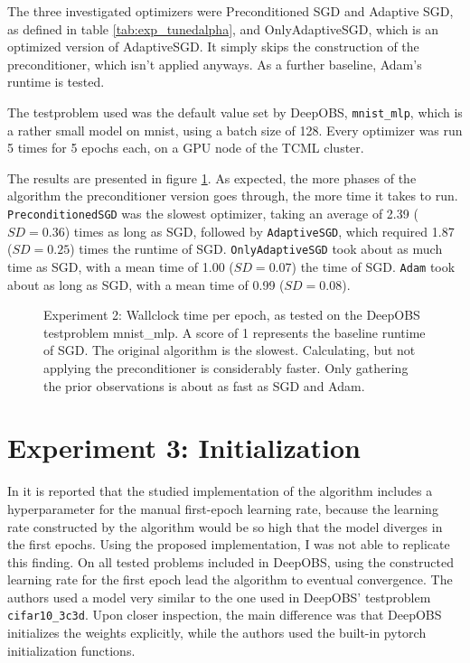\documentclass[twoside,12pt,a4paper]{report}
\begin{document}
The three investigated optimizers were Preconditioned SGD and Adaptive SGD, as defined in table \ref{tab:exp_tunedalpha}, and OnlyAdaptiveSGD, which is an optimized version of AdaptiveSGD. It simply skips the construction of the preconditioner, which isn't applied anyways.
As a further baseline, Adam's runtime is tested.

The testproblem used was the default value set by DeepOBS, \verb|mnist_mlp|, which is a rather small model on mnist, using a batch size of 128. Every optimizer was run 5 times for 5 epochs each, on a GPU node of the TCML cluster.

The results are presented in figure \ref{fig:exp_perf_prec}. As expected, the more phases of the algorithm the preconditioner version goes through, the more time it takes to run.
\verb|PreconditionedSGD| was the slowest optimizer, taking an average of 2.39 ($SD = 0.36$) times as long as SGD, followed by \verb|AdaptiveSGD|, which required 1.87 ($SD = 0.25$) times the runtime of SGD. \verb|OnlyAdaptiveSGD| took about as much time as SGD, with a mean time of 1.00 ($SD = 0.07$) the time of SGD. \verb|Adam| took about as long as SGD, with a mean time of 0.99 ($SD = 0.08$).

\begin{figure}
	\centering \hspace{-1,5cm}
	
	\caption{Experiment 2: Wallclock time per epoch, as tested on the DeepOBS testproblem mnist\_mlp. A score of 1 represents the baseline runtime of SGD. The original algorithm is the slowest. Calculating, but not applying the preconditioner is considerably faster. Only gathering the prior observations is about as fast as SGD and Adam.}
	\label{fig:exp_perf_prec}
	
\end{figure}


\section{Experiment 3: Initialization}
In \cite{roos2019active} it is reported that the studied implementation of the algorithm includes a hyperparameter for the manual first-epoch learning rate, because the learning rate constructed by the algorithm would be so high that the model diverges in the first epochs. Using the proposed implementation, I was not able to replicate this finding. On all tested problems included in DeepOBS, using the constructed learning rate for the first epoch lead the algorithm to eventual convergence. The authors used a model very similar to the one used in DeepOBS' testproblem \verb|cifar10_3c3d|. Upon closer inspection, the main difference was that DeepOBS initializes the weights explicitly, while the authors used the built-in pytorch initialization functions.
\end{document}
